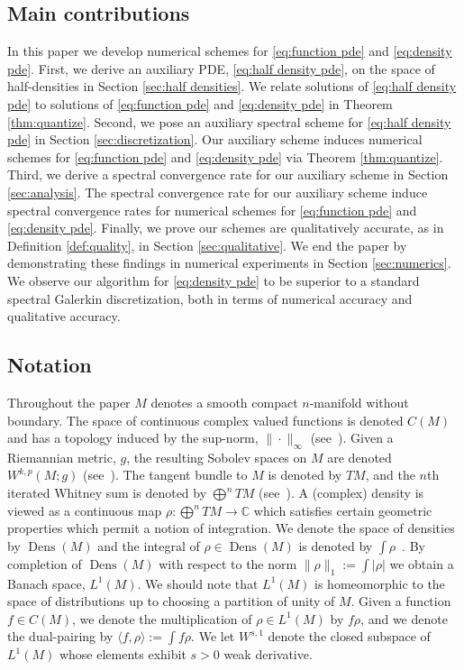 \documentclass[final,leqno]{siamart}
\DeclareMathOperator{\Dens}{Dens}
\begin{document}
\subsection{Main contributions}

In this paper we develop numerical schemes for \eqref{eq:function pde} and \eqref{eq:density pde}.
First, we derive an auxiliary PDE, \eqref{eq:half density pde}, on the space of half-densities in Section \ref{sec:half densities}.
We relate solutions of \eqref{eq:half density pde} to solutions of \eqref{eq:function pde} and \eqref{eq:density pde} in Theorem \ref{thm:quantize}.
Second, we pose an auxiliary spectral scheme for \eqref{eq:half density pde} in Section \ref{sec:discretization}.
Our auxiliary scheme induces numerical schemes for \eqref{eq:function pde} and \eqref{eq:density pde} via Theorem \ref{thm:quantize}.
Third, we derive a spectral convergence rate for our auxiliary scheme in Section \ref{sec:analysis}.
The spectral convergence rate for our auxiliary scheme induce spectral convergence rates for numerical schemes for \eqref{eq:function pde} and \eqref{eq:density pde}.
Finally, we prove our schemes are qualitatively accurate, as in Definition \ref{def:quality}, in Section \ref{sec:qualitative}.
We end the paper by demonstrating these findings in numerical experiments in Section \ref{sec:numerics}.
We observe our algorithm for \eqref{eq:density pde} to be superior to a standard spectral Galerkin discretization, both in terms of numerical accuracy and qualitative accuracy.

\subsection{Notation}
Throughout the paper $M$ denotes a smooth compact $n$-manifold without boundary. 
The space of continuous complex valued functions is denoted $C(M)$ and has a topology induced by the sup-norm, $\| \cdot \|_{\infty}$ (see~\cite{Taylor1974,Conway1990}).
Given a Riemannian metric, $g$, the resulting Sobolev spaces on $M$ are denoted $W^{k,p}(M ; g)$ (see~\cite{Hebey1999}).
The tangent bundle to $M$ is denoted by $TM$, and the $n$th iterated Whitney sum is denoted by $\bigoplus^{n} TM$ (see~\cite{Lee2006}).
A (complex) density is viewed as a continuous map $\rho: \bigoplus^{n}TM \to \mathbb{C}$ which satisfies certain geometric properties which permit a notion of integration.
We denote the space of densities by $\Dens(M)$ and the integral of $\rho \in \Dens(M)$ is denoted by $\int \rho$~\cite[Chapter 16]{Lee2006}.
By completion of $\Dens(M)$ with respect to the norm $\| \rho \|_{1} := \int | \rho|$ we obtain a Banach space, $L^{1}(M)$.
We should note that $L^1(M)$ is homeomorphic to the space of distributions up to choosing a partition of unity of $M$.
Given a function $f \in C(M)$, we denote the multiplication of $\rho \in L^{1}(M)$ by $f \rho$, and we denote the dual-pairing by $\langle f , \rho \rangle := \int f \rho$.
We let $W^{s,1}$ denote the closed subspace of $L^{1}(M)$ whose elements exhibit $s>0$ weak derivative.
\end{document}
